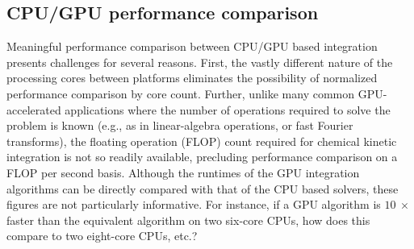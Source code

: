\documentclass[preprint]{elsarticle}
\begin{document}

\subsection{CPU\slash GPU performance comparison}

Meaningful performance comparison between CPU\slash GPU based integration presents challenges for several reasons.
First, the vastly different nature of the processing cores between platforms eliminates the possibility of normalized performance comparison by core count.
Further, unlike many common GPU-accelerated applications where the number of operations required to solve the problem is known (e.g., as in linear-algebra operations, or fast Fourier transforms), the floating operation (FLOP) count required for chemical kinetic integration is not so readily available, precluding performance comparison on a FLOP per second basis.
Although the runtimes of the GPU integration algorithms can be directly compared with that of the CPU based solvers, these figures are not particularly informative.
For instance, if a GPU algorithm is $\SI{10}{\times}$ faster than the equivalent algorithm on two six-core CPUs, how does this compare to two eight-core CPUs, etc.?
\end{document}
